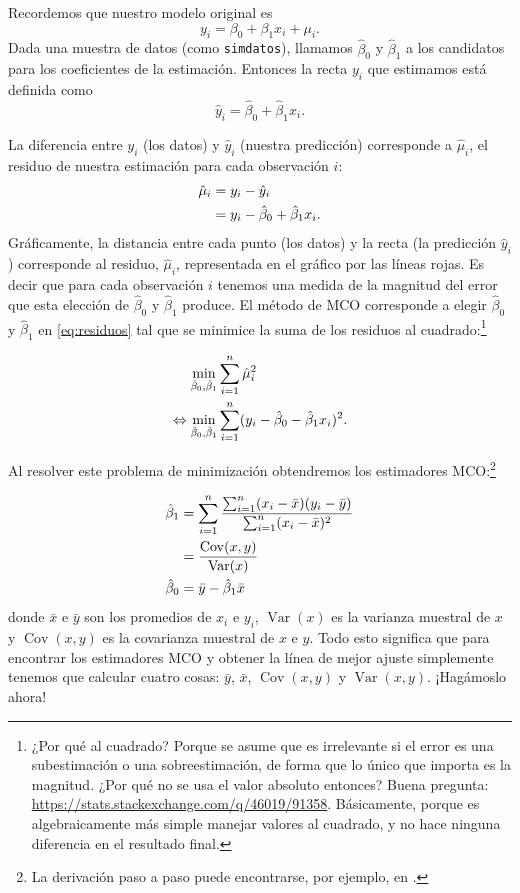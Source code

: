 \documentclass{report}\usepackage[]{graphicx}\usepackage[]{color}
\newcommand{\Var}{\operatorname{Var}}
\newcommand{\Cov}{\operatorname{Cov}}
\begin{document}
Recordemos que nuestro modelo original es
\begin{equation*}
y_i = \beta_0 + \beta_1 x_i + \mu_i.
\end{equation*}
Dada una muestra de datos (como \verb|simdatos|), llamamos $\hat\beta_0$ y $\hat\beta_1$ a los candidatos para los coeficientes de la estimación. Entonces la recta $y_i$ que estimamos está definida como
\begin{equation}
\hat y_i = \hat\beta_0 + \hat\beta_1 x_i.
\end{equation}

La diferencia entre $y_i$ (los datos) y $\hat y_i$ (nuestra predicción) corresponde a $\hat\mu_i$, el residuo de nuestra estimación para cada observación $i$: 
\begin{align}
\hat \mu_i &= y_i - \hat y_i \notag \\
           &= y_i - \hat\beta_0 + \hat\beta_1 x_i.
\label{eq:residuos}
\end{align}
Gráficamente, la distancia entre cada punto (los datos) y la recta (la predicción $\hat y_i$)  corresponde al residuo, $\hat\mu_i$, representada en el gráfico por las líneas rojas. 
Es decir que para cada observación $i$ tenemos una medida de la magnitud del error que esta elección de $\hat\beta_0$ y $\hat\beta_1$ produce.
El método de MCO corresponde a elegir $\hat\beta_0$ y $\hat\beta_1$ en \eqref{eq:residuos} tal que se minimice la suma de los residuos al cuadrado:\footnote{¿Por qué al cuadrado? Porque se asume que es irrelevante si el error es una subestimación o una sobreestimación, de forma que lo único que importa es la magnitud. ¿Por qué no se usa el valor absoluto entonces? Buena pregunta: \url{https://stats.stackexchange.com/q/46019/91358}. Básicamente, porque es algebraicamente más simple manejar valores al cuadrado, y no hace ninguna diferencia en el resultado final.}

\begin{align}
\min_{\hat\beta_0,\hat\beta_1} & \sum_{i=1}^n \hat\mu_i^2 \notag \\
\Leftrightarrow \min_{\hat\beta_0,\hat\beta_1} & \sum_{i=1}^n (y_i - \hat\beta_0 - \hat\beta_1 x_i)^2.
\label{eq:prob_min_MCO}
\end{align}

Al resolver este problema de minimización obtendremos los estimadores MCO:\footnote{La derivación paso a paso puede encontrarse, por ejemplo, en \textcite[cap. 2]{wooldridge_introductory_2013}.}

\begin{align}
\hat \beta_1 &= \sum_{i=1}^n \frac{\sum_{i=1}^n (x_i - \bar x)(y_i - \bar y)}{\sum_{i=1}^n (x_i - \bar x)^2} \notag \\
 &= \frac{\Cov (x,y)}{\Var(x)} \\
\hat \beta_0 &= \bar y - \hat\beta_1 \bar x
\end{align}
donde $\bar x$ e $\bar y$ son los promedios de $x_i$ e $y_i$, $\Var(x)$ es la varianza muestral de $x$ y $\Cov(x,y)$ es la covarianza muestral de $x$ e $y$.
Todo esto significa que para encontrar los estimadores MCO y obtener la línea de mejor ajuste simplemente tenemos que calcular cuatro cosas: $\bar y$, $\bar x$, $\Cov (x,y)$ y $\Var (x,y)$. ¡Hagámoslo ahora!
\end{document}
